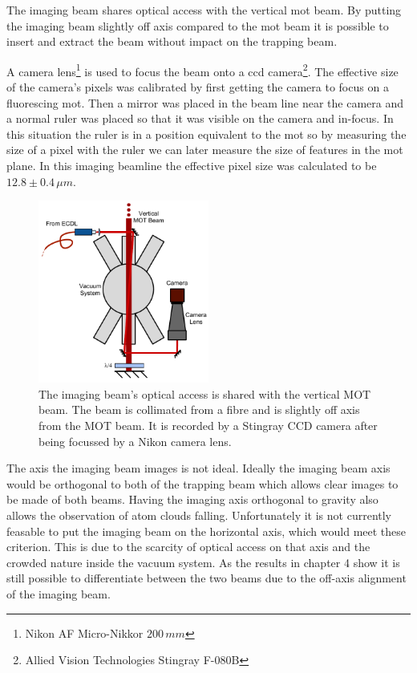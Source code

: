 The imaging beam shares optical access with the vertical \gls{mot} beam. By putting the imaging beam slightly off axis compared to the \gls{mot} beam it is possible to insert and extract the beam without impact on the trapping beam.

A camera lens\footnote{Nikon AF Micro-Nikkor $200\,\unit{mm}$} is used to focus the beam onto a \gls{ccd} camera\footnote{Allied Vision Technologies Stingray F-080B}. The effective size of the camera's pixels was calibrated by first getting the camera to focus on a fluorescing \gls{mot}. Then a mirror was placed in the beam line near the camera and a normal ruler was placed so that it was visible on the camera and in-focus. In this situation the ruler is in a position equivalent to the \gls{mot} so by measuring the size of a pixel with the ruler we can later measure the size of features in the \gls{mot} plane. In this imaging beamline the effective pixel size was calculated to be $12.8\pm0.4\,\unit{\mu m}$.

\begin{figure}[H]
\centering
\includegraphics[width=0.5\textwidth]{figs/ImagingRig.pdf}
\caption{The imaging beam's optical access is shared with the vertical MOT beam. The beam is collimated from a fibre and is slightly off axis from the MOT beam. It is recorded by a Stingray CCD camera after being focussed by a Nikon camera lens.}
\label{fig:imaging_rig}
\end{figure}

The axis the imaging beam images is not ideal. Ideally the imaging beam axis would be orthogonal to both of the trapping beam which allows clear images to be made of both beams. Having the imaging axis orthogonal to gravity also allows the observation of atom clouds falling. Unfortunately it is not currently feasable to put the imaging beam on the horizontal axis, which would meet these criterion. This is due to the scarcity of optical access on that axis and the crowded nature inside the vacuum system. As the results in chapter 4 show it is still possible to differentiate between the two beams due to the off-axis alignment of the imaging beam.

